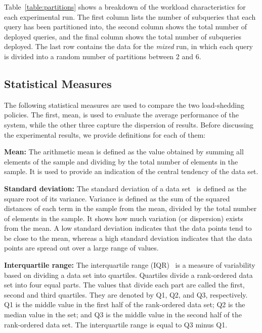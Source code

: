 Table~\ref{table:partitions} shows a breakdown of the workload characteristics for each experimental run.
The first column lists the number of subqueries that each query has been partitioned into, the second
column shows the total number of deployed queries, and the final column shows the total number of
subqueries deployed. The last row contains the data for the \emph{mixed} run, in which each query is
divided into a random number of partitions between 2 and 6.
% 


\vspace{-10pt}
\subsection*{Statistical Measures} 
The following statistical measures are used to compare the two \mbox{load-shedding} policies. 
The first, mean, is used to evaluate the average performance of the system, while the
other three capture the dispersion of results. 
Before discussing the experimental results, we provide definitions for each of them:

\textbf{Mean:} The arithmetic mean is defined as the value obtained by summing all elements of the
sample and dividing by the total number of elements in the sample. It is used to provide an
indication of the central tendency of the data set.

\textbf{Standard deviation:} The standard deviation of a data set~\cite{std} is defined as the square
root of its variance. Variance is defined as the sum of the squared distances of each term in the
sample from the mean, divided by the total number of elements in the sample.
It shows how much variation (or dispersion) exists from the mean. A low
standard deviation indicates that the data points tend to be close to the mean, whereas a high
standard deviation indicates that the data points are spread out over a large range of values.

\textbf{Interquartile range:} The interquartile range (IQR)~\cite{upton1996understanding} is a measure of
variability based on dividing a data set into quartiles.
Quartiles divide a rank-ordered data set into four equal parts. The values that divide each part are
called the first, second and third quartiles. They are denoted by Q1, Q2, and Q3, respectively. Q1 is the
middle value in the first half of the rank-ordered data set; Q2 is the median value in the set; and Q3 is
the middle value in the second half of the rank-ordered data set. The interquartile range is equal to
Q3 minus Q1.

